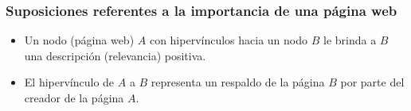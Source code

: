 \documentclass[
10pt, %
aspectratio=169, %
]{beamer}
\begin{document}
	\begin{frame}
		
		\frametitle{Suposiciones referentes a la importancia de una página web}
		
		\begin{itemize}
			\item Un nodo (página web) $A$ con hipervínculos hacia un nodo $B$ le brinda a $B$ una descripción (relevancia) positiva. \\[2mm]
			
			\item El hipervínculo de $A$ a $B$ representa un respaldo de la página $B$ por parte del creador de la página $A$.
			
		\end{itemize}
		
		
		
		
		
		\vspace{2\baselineskip}
		
\end{frame}
\end{document}
